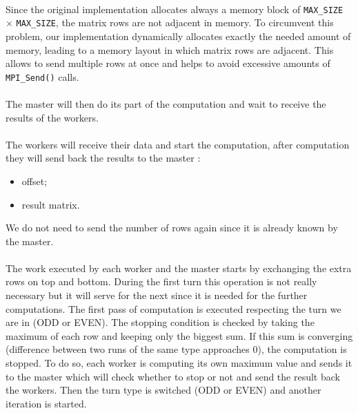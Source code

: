 \documentclass[]{article}
\begin{document}
\paragraph{} Since the original implementation allocates always a memory block of \texttt{MAX\_SIZE} $\times$ \texttt{MAX\_SIZE}, the matrix rows are not adjacent in memory. To circumvent this problem, our implementation dynamically allocates exactly the needed amount of memory, leading to a memory layout in which matrix rows are adjacent. This allows to send multiple rows at once and helps to avoid excessive amounts of \texttt{MPI\_Send()} calls.

\paragraph{} The master will then do its part of the computation and wait to receive the results of the workers. 

\paragraph{} The workers will receive their data and start the computation, after computation they will send back the results to the master : 
\begin{itemize}
	\item offset;
	\item result matrix.
\end{itemize}
We do not need to send the number of rows again since it is already known by the master. 

\paragraph{} The work executed by each worker and the master starts by exchanging the extra rows on top and bottom. During the first turn this operation is not really necessary but it will serve for the next since it is needed for the further computations. The first pass of computation is executed respecting the turn we are in (ODD or EVEN). The stopping condition is checked by taking the maximum of each row and keeping only the biggest sum. If this sum is converging (difference between two runs of the same type approaches $0$), the computation is stopped. To do so, each worker is computing its own maximum value and sends it to the master which will check whether to stop or not and send the result back the workers. Then the turn type is switched (ODD or EVEN) and another iteration is started.
\end{document}
